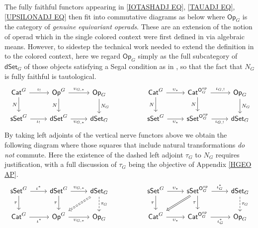 \documentclass[a4paper,10pt
,draft
]{article}%
\numberwithin{equation}{section}
\numberwithin{figure}{section}
\theoremstyle{definition} %
\newcommand{\1}{\ensuremath{\mathbbm 1}}%
\begin{document}
The fully faithful functors appearing in 
\eqref{IOTASHADJ EQ},
\eqref{TAUADJ EQ},
\eqref{UPSILONADJ EQ}
then fit into commutative diagrams
as below where $\mathsf{Op}_G$
is the category of \emph{genuine equivariant operads}.
These are an extension of the notion of operad
which in the single colored context were 
first defined in \cite{BP_geo}
via algebraic means. 
However, to sidestep the technical work needed to extend 
the definition in \cite{BP_geo} 
to the colored context,
here we regard $\mathsf{Op}_G$
simply as the full subcategory of 
$\mathsf{dSet}_G$
of those objects satisfying a Segal condition as in \cite[Defn. 3.35]{BP_edss},
so that the fact that
$N_G$ is fully faithful is tautological.
\begin{equation}\label{ALLFULL EQ}
\begin{tikzcd}
	\mathsf{Cat}^G
	\ar{r}{\iota_!}
	\ar{d}[swap]{N}
	&
	\mathsf{Op}^G
	\ar{r}{\upsilon_{G,\**}}
	\ar{d}[swap]{N}
	&
	\mathsf{Op}_G
	\ar{d}{N_G}
&&
	\mathsf{Cat}^G
	\ar{r}{\upsilon_{\**}}
	\ar{d}[swap]{N}
	&
	\mathsf{Cat}^{\mathsf{O}_G^{op}}
	\ar{r}{\iota_{G,!}}
	\ar{d}[swap]{N}
	&
	\mathsf{Op}_G
	\ar{d}{N_G}
\\
	\mathsf{sSet}^G
	\ar{r}[swap]{\iota_!}
	&
	\mathsf{dSet}^G
	\ar{r}[swap]{\upsilon_{G,\**}}
	&
	\mathsf{dSet}_G
	&&
	\mathsf{sSet}^G
	\ar{r}[swap]{\upsilon_{\**}}
	&
	\mathsf{sSet}^{\mathsf{O}_G^{op}}
	\ar{r}[swap]{\iota_{G,!}}
	&
\mathsf{dSet}_G
\end{tikzcd}
\end{equation}
By taking left adjoints of 
the vertical nerve functors above 
we obtain the following diagram
where those squares that include natural transformations
\emph{do not} commute. 
Here the existence of the dashed left adjoint 
$\tau_G$ to $N_G$
requires justification, 
with a full discussion of $\tau_G$
being the objective of Appendix \ref{HGEO AP}.
\begin{equation}\label{TAUFUNCTS EQ}
\begin{tikzcd}
	\mathsf{sSet}^G
	\ar{r}{\iota^{\**}}
	\ar{d}[swap]{\tau}
	&
	\mathsf{dSet}^G
	\ar{r}{\upsilon_{G,\**}}
	\ar{d}[swap]{\tau}
	&
	\mathsf{dSet}_G
	\ar[dashed]{d}{\tau_G}
	\ar[Rightarrow,dashed]{dl}
&&
	\mathsf{sSet}^G
	\ar{r}{\upsilon_{\**}}
	\ar{d}[swap]{\tau}
	&
	\mathsf{sSet}^{\mathsf{O}_G^{op}}
	\ar{r}{\iota^{\**}_G}
	\ar{d}[swap]{\tau}
	\ar[Rightarrow]{dl}
	&
	\mathsf{dSet}_G
	\ar[dashed]{d}{\tau_G}
\\
	\mathsf{Cat}^G
	\ar{r}[swap]{\iota^{\**}}
	&
	\mathsf{Op}^G
	\ar{r}[swap]{\upsilon_{G,\**}}
	&
	\mathsf{Op}_G
&&
	\mathsf{Cat}^G
	\ar{r}[swap]{\upsilon_{\**}}
	&
	\mathsf{Cat}^{\mathsf{O}_G^{op}}
	\ar{r}[swap]{\iota_{G}^{\**}}
	&
	\mathsf{Op}_G
\end{tikzcd}
\end{equation}
\end{document}
